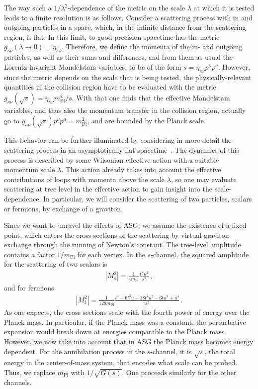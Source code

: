 \documentclass{article}
\def\beqn{\begin{eqnarray}}
\def\eeqn{\end{eqnarray}}
\begin{document}
The way such a $1/\lambda^2$-dependence of the metric on the scale $\lambda$ at which
it is tested leads to a finite resolution is as follows. Consider a scattering process
with in and outgoing particles in a space, which, in the infinite distance from the
scattering region, is flat. In this limit,  to good precision spacetime has the metric 
$g_{\kappa \nu}(\lambda \to 0) =\eta_{\kappa \nu}$.  Therefore, we define the
momenta of the in- and outgoing particles, as well as their sums and differences,
and from them as usual the Lorentz-invariant Mandelstam variables, to be of the form 
$s = \eta_{\kappa \nu}p^\kappa p^\nu$. However, since the metric depends on the
scale that is being tested, the physically-relevant quantities in the collision region 
have to be evaluated with the metric $g_{\kappa \nu}(\sqrt{s}) =
\eta_{\kappa \nu} m^2_{\mathrm{Pl}}/s $. With that one 
finds that the effective Mandelstam variables, and thus also the momentum transfer in the
collision region, actually go to $g_{\kappa \nu}(\sqrt{s})p^\nu p^\mu = m_{\mathrm{Pl}}^2$,
and are bounded by the Planck scale. 

This behavior can be further illuminated by considering in more detail the scattering process in
an asymptotically-flat spacetime~\cite{Percacci:2010af}. The dynamics of this process
is described by some Wilsonian effective action with a suitable momentum scale $\lambda$. 
This action already takes into account the effective contributions of loops with momenta
above the scale $\lambda$, so one may evaluate scattering at tree level in the
effective action to gain insight into the scale-dependence. In particular, we will
consider the scattering of two particles, scalars or fermions, by exchange of a graviton.

Since we want to unravel the effects of ASG, we assume 
the existence of a fixed point, which enters the cross sections of the scattering
by virtual graviton exchange through the running of Newton's constant. The
tree-level amplitude contains a factor $1/m_{\mathrm{Pl}}$ for each vertex. In the $s$-channel, 
the
squared amplitude for the scattering of two scalars is
\beqn
|M_{\mathrm{s}}^2| = \frac{1}{4 m_{\mathrm{Pl}}} \frac{t^2 u^2}{s^2} \,,
\eeqn
and for fermions
\beqn
|M_{\mathrm{f}}^2| = \frac{1}{128 m_{\mathrm{Pl}}} \frac{t^4-6t^3u +18 t^2 u^2 - 6 tu^3 +u^4}{s^2} \,.
\eeqn
As one expects, the cross sections scale with the fourth power of energy over the Planck mass. In
particular, if the Planck mass was a constant, the perturbative expansion would break down at
energies comparable to the Planck mass. However, we now take into account that in {\sc ASG} the
Planck mass becomes energy dependent. For the annihilation process in the $s$-channel, it
is $\sqrt{s}$, the total energy in the center-of-mass system, that encodes what 
scale can be probed. Thus, we replace $m_{\mathrm{Pl}}$ with $1/\sqrt{G(s)}$. One proceeds similarly
for the other channels.
\end{document}
